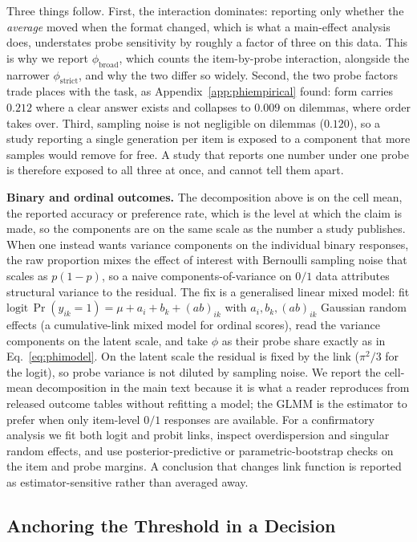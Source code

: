 \documentclass[11pt]{article}
\begin{document}
Three things follow. First, the interaction dominates: reporting only whether
the \emph{average} moved when the format changed, which is what a main-effect
analysis does, understates probe sensitivity by roughly a factor of three on
this data. This is why we report $\phi_{\text{broad}}$, which counts the
item-by-probe interaction, alongside the narrower $\phi_{\text{strict}}$, and
why the two differ so widely. Second, the two probe factors trade places with
the task, as Appendix~\ref{app:phiempirical} found: form carries $0.212$ where a
clear answer exists and collapses to $0.009$ on dilemmas, where order takes
over. Third, sampling noise is not negligible on dilemmas ($0.120$), so a study
reporting a single generation per item is exposed to a component that more
samples would remove for free. A study that reports one number under one probe
is therefore exposed to all three at once, and cannot tell them apart.

\textbf{Binary and ordinal outcomes.} The decomposition above is on the cell
mean, the reported accuracy or preference rate, which is the level at which the
claim is made, so the components are on the same scale as the number a study
publishes. When one instead wants variance components on the individual binary
responses, the raw proportion mixes the effect of interest with Bernoulli
sampling noise that scales as $p(1-p)$, so a naive components-of-variance on
$0/1$ data attributes structural variance to the residual. The fix is a
generalised linear mixed model: fit
$\text{logit}\,\Pr(y_{ik}=1)=\mu+a_i+b_k+(ab)_{ik}$ with $a_i,b_k,(ab)_{ik}$
Gaussian random effects (a cumulative-link mixed model for ordinal scores), read
the variance components on the latent scale, and take $\phi$ as their probe
share exactly as in Eq.~\ref{eq:phimodel}. On the latent scale the residual is
fixed by the link ($\pi^2/3$ for the logit), so probe variance is not diluted by
sampling noise. We report the cell-mean decomposition in the main text because
it is what a reader reproduces from released outcome tables without refitting a
model; the GLMM is the estimator to prefer when only item-level $0/1$ responses
are available.
For a confirmatory analysis we fit both logit and probit links, inspect
overdispersion and singular random effects, and use posterior-predictive or
parametric-bootstrap checks on the item and probe margins. A conclusion that
changes link function is reported as estimator-sensitive rather than averaged
away.

\subsection{Anchoring the Threshold in a Decision}
\label{app:phithreshold}
\end{document}
